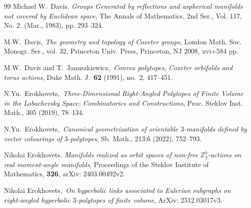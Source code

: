 \documentclass[12pt]{amsart}
\theoremstyle{definition}
\theoremstyle{remark}
\begin{document}
\begin{thebibliography}{99}
Michael W.~Davis.
\emph{Groups Generated by reflections and aspherical manifolds not covered by Euclidean space},
The Annals of Mathematics, 2nd Ser., Vol. 117, No. 2. (Mar., 1983), pp. 293--324.

M.W.~Davis, 
\emph{The geometry and topology of Coxeter groups},
London Math. Soc. Monogr. Ser., vol. 32, Princeton Univ. Press, Princeton, NJ 2008, xvi+584 pp.

M.W.~Davis and T.~Januszkiewicz,\, 
\emph{Convex polytopes, Coxeter orbifolds and torus actions}, 
Duke Math. J.~{\bf62} (1991), no.~2, 417--451.


N.Yu.~Erokhovets,\,
\emph{Three-Dimensional Right-Angled Polytopes of Finite Volume in the Lobachevsky Space: Combinatorics and Constructions},
Proc. Steklov Inst. Math., 305 (2019), 78--134.

N.Yu.~Erokhovets,\,
\emph{Canonical geometrization of orientable $3$-manifolds defined by vector colourings of $3$-polytopes},
Sb. Math., 213:6 (2022), 752--793.

Nikolai Erokhovets. \emph{Manifolds realized as orbit spaces 
of non-free  $\mathbb Z_2^k$-actions on real moment-angle manifolds},
Proceedings of the Steklov Institute of Mathematics, {\bf 326},
arXiv: 2403.00492v2.

Nikolai Erokhovets,\,
\emph{On hyperbolic links associated to Eulerian subgraphs on right-angled
hyperbolic $3$-polytopes of finite volume}, 
ArXiv: 2512.03017v3.






\end{thebibliography}
\end{document}
